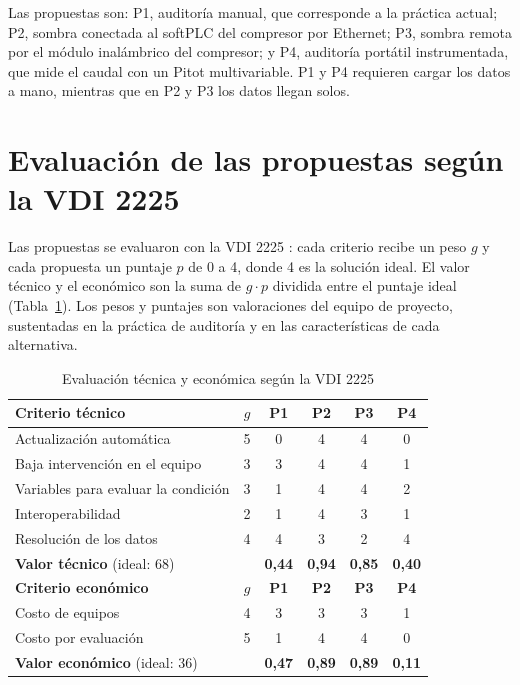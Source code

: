 Las propuestas son: P1, auditoría manual, que corresponde a la práctica actual; P2, sombra conectada al softPLC del compresor por Ethernet; P3, sombra remota por el módulo inalámbrico del compresor; y P4, auditoría portátil instrumentada, que mide el caudal con un Pitot multivariable. P1 y P4 requieren cargar los datos a mano, mientras que en P2 y P3 los datos llegan solos.

\section{Evaluación de las propuestas según la VDI 2225}

Las propuestas se evaluaron con la VDI 2225 \cite{vdi2225}: cada criterio recibe un peso $g$ y cada propuesta un puntaje $p$ de 0 a 4, donde 4 es la solución ideal. El valor técnico y el económico son la suma de $g \cdot p$ dividida entre el puntaje ideal (Tabla~\ref{tab:vdi}). Los pesos y puntajes son valoraciones del equipo de proyecto, sustentadas en la práctica de auditoría y en las características de cada alternativa.

\begin{table}[htbp]
\centering
\caption{Evaluación técnica y económica según la VDI 2225}
\label{tab:vdi}
\footnotesize
\renewcommand{\arraystretch}{1.25}
\begin{tabular}{|p{5.4cm}|c|c|c|c|c|}
\hline
\textbf{Criterio técnico} & \textbf{$g$} & \textbf{P1} & \textbf{P2} & \textbf{P3} & \textbf{P4} \\ \hline
Actualización automática & 5 & 0 & 4 & 4 & 0 \\ \hline
Baja intervención en el equipo & 3 & 3 & 4 & 4 & 1 \\ \hline
Variables para evaluar la condición & 3 & 1 & 4 & 4 & 2 \\ \hline
Interoperabilidad & 2 & 1 & 4 & 3 & 1 \\ \hline
Resolución de los datos & 4 & 4 & 3 & 2 & 4 \\ \hline
\textbf{Valor técnico} (ideal: 68) & & \textbf{0,44} & \textbf{0,94} & \textbf{0,85} & \textbf{0,40} \\ \hline \hline
\textbf{Criterio económico} & \textbf{$g$} & \textbf{P1} & \textbf{P2} & \textbf{P3} & \textbf{P4} \\ \hline
Costo de equipos & 4 & 3 & 3 & 3 & 1 \\ \hline
Costo por evaluación & 5 & 1 & 4 & 4 & 0 \\ \hline
\textbf{Valor económico} (ideal: 36) & & \textbf{0,47} & \textbf{0,89} & \textbf{0,89} & \textbf{0,11} \\ \hline
\end{tabular}
\end{table}

